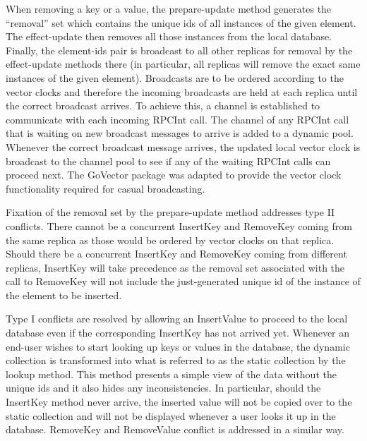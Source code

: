 \documentclass[sigconf,nonacm,10pt]{acmart}
\begin{document}
When removing a key or a value, the prepare-update method generates the ``removal'' set which contains the unique ids of all instances of the given element. The effect-update then removes all those instances from the local database. Finally, the element-ids pair is broadcast to all other replicas for removal by the effect-update methods there (in particular, all replicas will remove the exact same instances of the given element).
Broadcasts are to be ordered according to the vector clocks and therefore the incoming broadcasts are held at each replica until the correct broadcast arrives. To achieve this, a channel is established to communicate with each incoming RPCInt call. The channel of any RPCInt call that is waiting on new broadcast messages to arrive is added to a dynamic pool. Whenever the correct broadcast message arrives, the updated local vector clock is broadcast to the channel pool to see if any of the waiting RPCInt calls can proceed next. The GoVector package was adapted to provide the vector clock functionality required for casual broadcasting.

Fixation of the removal set by the prepare-update method addresses type II conflicts. There cannot be a concurrent InsertKey and RemoveKey coming from the same replica as those would be ordered by vector clocks on that replica. Should there be a concurrent InsertKey and RemoveKey coming from different replicas, InsertKey will take precedence as the removal set associated with the call to RemoveKey will not include the just-generated unique id of the instance of the element to be inserted.

Type I conflicts are resolved by allowing an InsertValue to proceed to the local database even if the corresponding InsertKey has not arrived yet. Whenever an end-user wishes to start looking up keys or values in the database, the dynamic collection is transformed into what is referred to as the static collection by the lookup method. This method presents a simple view of the data without the unique ids and it also hides any inconsistencies. In particular, should the InsertKey method never arrive, the inserted value will not be copied over to the static collection and will not be displayed whenever a user looks it up in the database. RemoveKey and RemoveValue conflict is addressed in a similar way.
\end{document}
